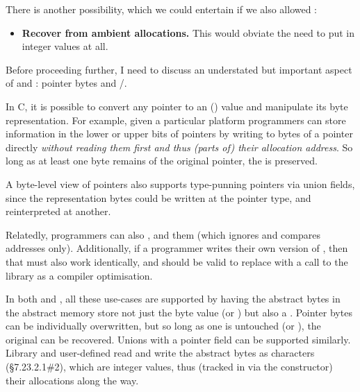 There is another possibility, which we could entertain if we also allowed
:
\begin{itemize}
    \item \textbf{Recover  from ambient 
        allocations.} This would obviate the need to put  in
        integer values at all.
\end{itemize}

Before proceeding further, I need to discuss an understated but important
aspect of  and : pointer bytes and
/.

In C, it is possible to convert any pointer to an ()
 value and manipulate its byte representation. For example,
given a particular platform programmers can store information in the lower or upper bits of
pointers by writing to bytes of a pointer directly
\emph{without reading them first and thus  (parts of) their allocation
address}. So long as at least one byte remains of the original pointer, the
 is preserved.

A byte-level view of pointers also supports type-punning pointers via union
fields, since the representation bytes could be written at the pointer type,
and reinterpreted at another.

Relatedly, programmers can also , and  them
(which ignores  and compares addresses only). Additionally, if
a programmer writes their own version of , then that must also
work identically, and should be valid to replace with a call to the library
 as a compiler optimisation.

In both  and , all these use-cases are supported by
having the abstract bytes in the abstract memory  store not just the byte
value (or ) but also a . Pointer bytes
can be individually overwritten, but so long as one is untouched (or
), the original  can be recovered. Unions with a
pointer field can be supported similarly. Library and user-defined
 read and write the abstract bytes as characters
(§7.23.2.1\#2), which are integer values, thus  (tracked in
 via the  constructor) their allocations along the way.

